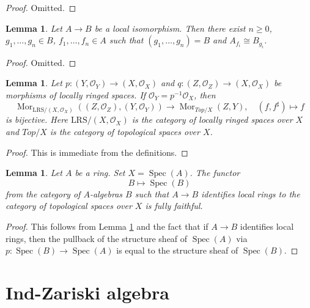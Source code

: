 \documentclass[10pt,a4paper]{article}
\theoremstyle{plain}
\newtheorem{lemma}[subsection]{Lemma}
\theoremstyle{definition}
\theoremstyle{remark}
\numberwithin{equation}{subsection}
\def\Spec{\mathop{\mathrm{Spec}}}
\def\Mor{\mathop{\mathrm{Mor}}\nolimits}
\begin{document}
\begin{proof}
Omitted.
\end{proof}

\begin{lemma}
\label{lemma-structure-local-isomorphism}
Let $A \to B$ be a local isomorphism. Then there exist $n \geq 0$,
$g_1, \ldots, g_n \in B$, $f_1, \ldots, f_n \in A$ such that
$(g_1, \ldots, g_n) = B$ and $A_{f_i} \cong B_{g_i}$.
\end{lemma}

\begin{proof}
Omitted.
\end{proof}

\begin{lemma}
\label{lemma-fully-faithful-spaces-over-X}
Let $p : (Y, \mathcal{O}_Y) \to (X, \mathcal{O}_X)$ and
$q : (Z, \mathcal{O}_Z) \to (X, \mathcal{O}_X)$
be morphisms of locally ringed spaces.
If $\mathcal{O}_Y = p^{-1}\mathcal{O}_X$, then
$$
\Mor_{\text{LRS}/(X, \mathcal{O}_X)}((Z, \mathcal{O}_Z), (Y, \mathcal{O}_Y))
\longrightarrow
\Mor_{\textit{Top}/X}(Z, Y),\quad
(f, f^\sharp) \longmapsto f
$$
is bijective. Here $\text{LRS}/(X, \mathcal{O}_X)$ is the category of
locally ringed spaces over $X$ and $\textit{Top}/X$ is the category
of topological spaces over $X$.
\end{lemma}

\begin{proof}
This is immediate from the definitions.
\end{proof}

\begin{lemma}
\label{lemma-local-isomorphism-fully-faithful}
Let $A$ be a ring. Set $X = \Spec(A)$. The functor
$$
B \longmapsto \Spec(B)
$$
from the category of $A$-algebras $B$ such that $A \to B$ identifies
local rings to the category of
topological spaces over $X$ is fully faithful.
\end{lemma}

\begin{proof}
This follows from Lemma \ref{lemma-fully-faithful-spaces-over-X}
and the fact that if $A \to B$ identifies local rings, then the pullback
of the structure sheaf of $\Spec(A)$ via $p : \Spec(B) \to \Spec(A)$
is equal to the structure sheaf of $\Spec(B)$.
\end{proof}




\section{Ind-Zariski algebra}
\label{section-ind-zariski}
\end{document}
